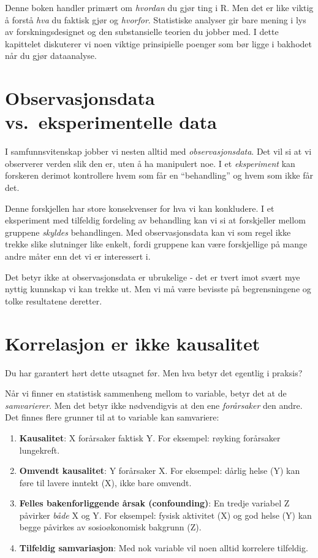 \documentclass[
  norsk,
  letterpaper,
  DIV=11,
  numbers=noendperiod]{scrreprt}
\providecommand{\tightlist}{%
  \setlength{\itemsep}{0pt}\setlength{\parskip}{0pt}}
\theoremstyle{definition}
\theoremstyle{remark}
\begin{document}
Denne boken handler primært om \emph{hvordan} du gjør ting i R. Men det
er like viktig å forstå \emph{hva} du faktisk gjør og \emph{hvorfor}.
Statistiske analyser gir bare mening i lys av forskningsdesignet og den
substansielle teorien du jobber med. I dette kapittelet diskuterer vi
noen viktige prinsipielle poenger som bør ligge i bakhodet når du gjør
dataanalyse.

\section{Observasjonsdata vs.~eksperimentelle
data}\label{observasjonsdata-vs.-eksperimentelle-data}

I samfunnsvitenskap jobber vi nesten alltid med \emph{observasjonsdata}.
Det vil si at vi observerer verden slik den er, uten å ha manipulert
noe. I et \emph{eksperiment} kan forskeren derimot kontrollere hvem som
får en ``behandling'' og hvem som ikke får det.

Denne forskjellen har store konsekvenser for hva vi kan konkludere. I et
eksperiment med tilfeldig fordeling av behandling kan vi si at
forskjeller mellom gruppene \emph{skyldes} behandlingen. Med
observasjonsdata kan vi som regel ikke trekke slike slutninger like
enkelt, fordi gruppene kan være forskjellige på mange andre måter enn
det vi er interessert i.

Det betyr ikke at observasjonsdata er ubrukelige - det er tvert imot
svært mye nyttig kunnskap vi kan trekke ut. Men vi må være bevisste på
begrensningene og tolke resultatene deretter.

\section{Korrelasjon er ikke
kausalitet}\label{korrelasjon-er-ikke-kausalitet}

Du har garantert hørt dette utsagnet før. Men hva betyr det egentlig i
praksis?

Når vi finner en statistisk sammenheng mellom to variable, betyr det at
de \emph{samvarierer}. Men det betyr ikke nødvendigvis at den ene
\emph{forårsaker} den andre. Det finnes flere grunner til at to variable
kan samvariere:

\begin{enumerate}
\def\labelenumi{\arabic{enumi}.}
\tightlist
\item
  \textbf{Kausalitet}: X forårsaker faktisk Y. For eksempel: røyking
  forårsaker lungekreft.
\item
  \textbf{Omvendt kausalitet}: Y forårsaker X. For eksempel: dårlig
  helse (Y) kan føre til lavere inntekt (X), ikke bare omvendt.
\item
  \textbf{Felles bakenforliggende årsak (confounding)}: En tredje
  variabel Z påvirker \emph{både} X og Y. For eksempel: fysisk aktivitet
  (X) og god helse (Y) kan begge påvirkes av sosioøkonomisk bakgrunn
  (Z).
\item
  \textbf{Tilfeldig samvariasjon}: Med nok variable vil noen alltid
  korrelere tilfeldig.
\end{enumerate}
\end{document}
